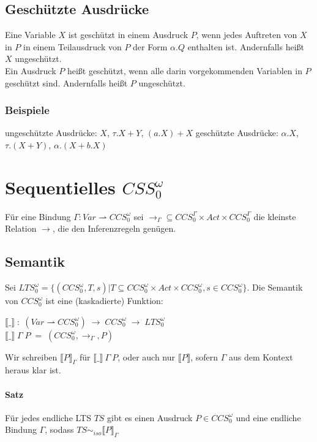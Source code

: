 \documentclass[a4paper,10pt, oneside]{book}
\begin{document}
\subsection{Geschützte Ausdrücke}
Eine Variable $X$ ist geschützt in einem Ausdruck $P$, wenn jedes Auftreten von $X$ in $P$ in einem Teilausdruck von $P$ der Form $\alpha.Q$ enthalten ist. Andernfalls heißt $X$ ungeschützt.\\
Ein Ausdruck $P$ heißt geschützt, wenn alle darin vorgekommenden Variablen in $P$ geschützt sind. Andernfalls heißt $P$ ungeschützt.

\subsubsection{Beispiele}

 ungeschützte Ausdrücke: $X$, $\tau.X + Y$, $(a.X) + X$
\hfill
geschützte Ausdrücke: $\alpha.X$, $\tau.(X + Y)$, $\alpha.(X + b.X)$

\section{Sequentielles $CSS_0^{\omega}$}
Für eine Bindung $\Gamma: Var \rightharpoonup CCS_0^{\omega}$ sei $ \rightarrow_{\Gamma} \subseteq CCS_0^{\Gamma} \times Act \times CCS_0^{\Gamma}$ die kleinste Relation $\longrightarrow$, die den Inferenzregeln genügen.

\subsection{Semantik}
Sei $LTS_0^{\omega} = \{(CCS_0^{\omega}, T, s) | T \subseteq CCS_0^{\omega} \times Act \times CCS_0^{\omega}, s \in CCS_0^{\omega}\}$. Die Semantik von $CCS_0^{\omega}$ ist eine (kaskadierte) Funktion:\\
\begin{center}
 $\llbracket\_\rrbracket \; : \; (Var \rightharpoonup CCS_0^{\omega}) \; \rightarrow \; CCS_0^{\omega} \; \rightarrow \;  LTS_0^{\omega}$\\
 $\llbracket\_\rrbracket \; \Gamma \; P \; = \; (CCS_0^{\omega}, \rightarrow_{\Gamma}, P)$
\end{center}
Wir schreiben $\llbracket P \rrbracket_{\Gamma}$ für $\llbracket \_ \rrbracket \: \Gamma \: P$, oder auch nur $\llbracket P \rrbracket$, sofern $\Gamma$ aus dem Kontext heraus klar ist.

\paragraph{Satz}
Für jedes endliche LTS $TS$ gibt es einen Ausdruck $P \in CCS_0^{\omega}$ und eine endliche Bindung $\Gamma$, sodass $TS \sim_{iso} \llbracket P \rrbracket_{\Gamma}$
\end{document}
